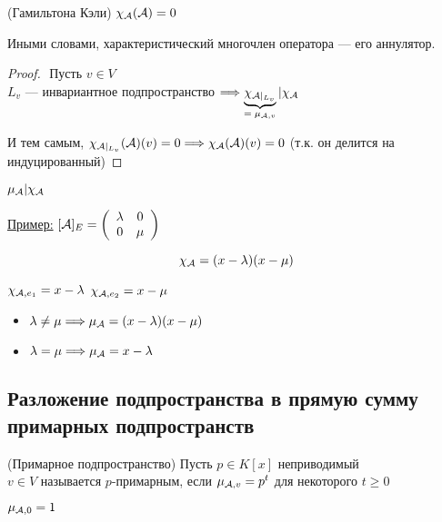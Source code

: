 \begin{theorem-non}(Гамильтона Кэли)
    $\chi_{\mathcal{A}} (\mathcal{A}) = 0$ 

    Иными словами, характеристический многочлен оператора --- его аннулятор.

    \begin{proof}
    $ $ \newline
    Пусть $v \in V$ \\
    $L_v$ --- инвариантное подпространство $\Longrightarrow \underbrace{\chi_{\mathcal{A} |_{L_{v}}}}_{\text{$ = \mu_{\mathcal{A}, v} $}}  | \chi_{\mathcal{A}}$

    И тем самым, $\chi_{\mathcal{A} |_{L_{v}}}(\mathcal{A})(v) = 0 \Longrightarrow \chi_{\mathcal{A}}(\mathcal{A})(v) = 0$ (т.к. он делится на индуцированный)
    \end{proof}
\end{theorem-non}

\follow $\mu_{\mathcal{A}} | \chi_{\mathcal{A}}$

\underline{Пример:}
$[\mathcal{A}]_E = \left(\begin{array}{cc}
\lambda & 0 \\ 
0 & \mu
\end{array}\right)$

\[ \chi_{\mathcal{A}} = (x - \lambda)(x - \mu) \]

$\chi_{\mathcal{A}, e_1} = x - \lambda$
$\chi_{\mathcal{A}, e_2} = x - \mu$

\begin{itemize}
    \item $ \lambda \neq \mu \Longrightarrow \mu_{\mathcal{A}} = (x - \lambda) (x - \mu)$
    \item $ \lambda = \mu \Longrightarrow \mu_{\mathcal{A}} = x - \lambda$
\end{itemize}

\subsection{Разложение подпространства в прямую сумму примарных подпространств}

\begin{conj}(Примарное подпространство)
    Пусть $p \in K[x]$ неприводимый \\
    $ v \in V $ называется $p$-примарным, если $\mu_{\mathcal{A}, v} = p^t$ для некоторого $t \geqslant 0$

    \notice $ \mu_{\mathcal{A}, 0} = 1 $
\end{conj}

